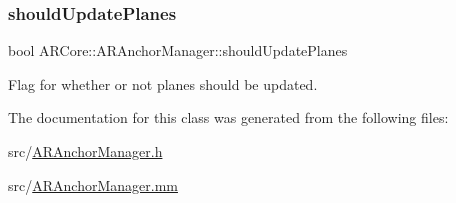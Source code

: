 \subsubsection{\texorpdfstring{should\+Update\+Planes}{shouldUpdatePlanes}}
{\footnotesize\ttfamily bool A\+R\+Core\+::\+A\+R\+Anchor\+Manager\+::should\+Update\+Planes}



Flag for whether or not planes should be updated. 



The documentation for this class was generated from the following files\+:\begin{DoxyCompactItemize}
\item 
src/\hyperlink{_a_r_anchor_manager_8h}{A\+R\+Anchor\+Manager.\+h}\item 
src/\hyperlink{_a_r_anchor_manager_8mm}{A\+R\+Anchor\+Manager.\+mm}\end{DoxyCompactItemize}
